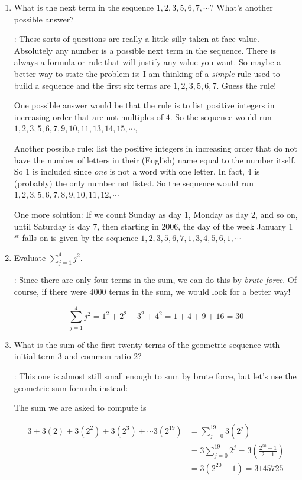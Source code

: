 \documentclass[11pt]{amsart}
\begin{document}
\begin{enumerate}


\item What is the next term in the sequence $1,2,3,5,6,7,\cdots$? What's
another possible answer?

: These sorts of questions are really a little silly taken at face value. 
Absolutely any number is a possible next term in the sequence. There is always a 
formula or rule that will justify any value you want. So maybe a better way to state the
problem is: I am thinking of a  {\it simple} rule used to build a sequence and the first six terms
are $1,2,3,5,6,7$. Guess the rule!

One possible answer would be that the rule is to list positive integers in increasing order that are not multiples of $4$.
So the sequence would run $1,2,3,5,6,7,9,10,11,13,14,15,\cdots$,

Another possible rule: list the positive integers in increasing order that do not have
the number of letters in their (English) name equal to the number itself. So $1$ is included
since {\it one} is not a word with one letter. In fact, $4$ is (probably) the only number not
listed. So the sequence would run $1,2,3,5,6,7,8,9,10,11,12,\cdots$

One more solution: If we count Sunday as day 1, Monday as day 2, and so on, until Saturday
is day 7, then starting in 2006,  the day of the week January 1$^{st}$ falls on is given by the
sequence $1,2,3,5,6,7,1,3,4,5,6,1,\cdots$

\item Evaluate $\sum_{j=1}^{4} j^2$.
\medskip

: Since there are only four terms in the sum, we can do this by {\it brute force}.
Of course, if there were $4000$ terms in the sum, we would look for a better way!

$$\sum_{j=1}^{4} j^2 = 1^2+2^2+3^2+4^2 = 1+4+9+16 = 30$$

\item What is the sum of the first twenty terms of the geometric sequence with initial
term $3$ and common ratio $2$?

: This one is almost still small enough to sum by brute force, but let's use the
geometric sum formula instead:

The sum we are asked to compute is 

\begin{align*}
3 + 3(2) + 3(2^2) + 3(2^3) + \cdots 3(2^{19}) & = \sum_{j=0}^{19}3(2^j)\\[5pt]
& = 3\sum_{j=0}^{19} 2^j = 3\left(\frac{2^{20}-1}{2-1}\right) \\[5pt]
& = 3(2^{20}-1) = 3145725
\end{align*}



\end{enumerate}
\end{document}
